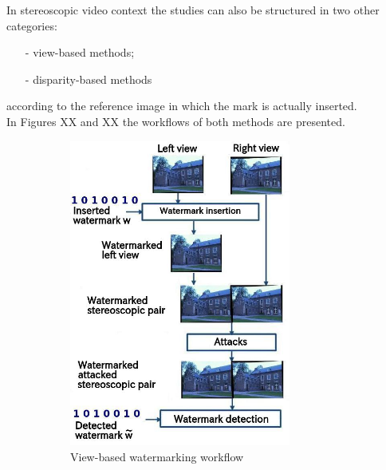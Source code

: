 In stereoscopic video context the studies can also be structured in two other categories:
\begin{itemize}
\item[-] view-based methods;
\item[-] disparity-based methods
\end{itemize}
according to the reference image in which the mark is actually inserted.\\
In Figures XX and XX the workflows of both methods are presented.
\begin{figure}[h!]
\centering
\begin{subfigure}[]{0.4\textwidth}
\centering
\includegraphics[width=0.8\textwidth]{./img/views_domain.jpeg}
\caption{\small{View-based watermarking workflow}}
\label{fig:view}
\end{subfigure}%
~ %
\begin{subfigure}[]{0.4\textwidth}
\centering

\end{subfigure}
\end{figure}
